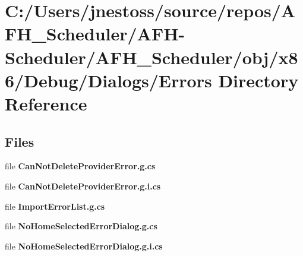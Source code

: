 \section{C\+:/\+Users/jnestoss/source/repos/\+A\+F\+H\+\_\+\+Scheduler/\+A\+F\+H-\/\+Scheduler/\+A\+F\+H\+\_\+\+Scheduler/obj/x86/\+Debug/\+Dialogs/\+Errors Directory Reference}
\label{dir_ae13b237078974053ca37a5b3ee1e77d}
\subsection*{Files}
\begin{DoxyCompactItemize}
\item 
file \textbf{ Can\+Not\+Delete\+Provider\+Error.\+g.\+cs}
\item 
file \textbf{ Can\+Not\+Delete\+Provider\+Error.\+g.\+i.\+cs}
\item 
file \textbf{ Import\+Error\+List.\+g.\+cs}
\item 
file \textbf{ No\+Home\+Selected\+Error\+Dialog.\+g.\+cs}
\item 
file \textbf{ No\+Home\+Selected\+Error\+Dialog.\+g.\+i.\+cs}
\end{DoxyCompactItemize}
